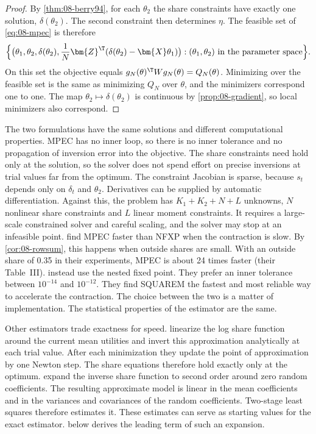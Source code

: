 \begin{proof}
By \cref{thm:08-berry94}, for each $\theta_2$ the share constraints have exactly one solution,
$\delta(\theta_2)$. The second constraint then determines $\eta$. The feasible set of \eqref{eq:08-mpec} is
therefore
\begin{equation*}
  \Big\{\big(\theta_1, \theta_2, \delta(\theta_2), \frac{1}{N}\bm{Z}^\T(\delta(\theta_2) -
  \bm{X}\theta_1)\big): (\theta_1, \theta_2) \text{ in the parameter space}\Big\}.
\end{equation*}
On this set the objective equals $g_N(\theta)^\T Wg_N(\theta) = Q_N(\theta)$. Minimizing over the feasible set
is the same as minimizing $Q_N$ over $\theta$, and the minimizers correspond one to one. The map
$\theta_2 \mapsto \delta(\theta_2)$ is continuous by \cref{prop:08-gradient}, so local minimizers also
correspond.
\end{proof}

The two formulations have the same solutions and different computational properties. MPEC has no inner loop,
so there is no inner tolerance and no propagation of inversion error into the objective. The share
constraints need hold only at the solution, so the solver does not spend effort on precise inversions at trial
values far from the optimum. The constraint Jacobian is sparse, because $s_t$ depends only on $\delta_t$ and
$\theta_2$. Derivatives can be supplied by automatic differentiation. Against this, the problem has $K_1 +
K_2 + N + L$ unknowns, $N$ nonlinear share constraints and $L$ linear moment constraints. It requires a large-scale constrained solver and
careful scaling, and the solver may stop at an infeasible point. \citet[Section~7]{DubeFoxSu2012} find MPEC
faster than NFXP when the contraction is slow. By \cref{cor:08-rowsum}, this happens when outside shares are
small. With an outside share of 0.35 in their experiments, MPEC is about 24 times faster (their Table~III).
\citet[Sections~3 and~5]{ConlonGortmaker2020} instead use the nested fixed point. They prefer an inner tolerance
between $10^{-14}$ and $10^{-12}$. They find SQUAREM the fastest and most reliable way to accelerate the
contraction.
The choice between the two is a matter of implementation. The statistical properties of the estimator are the same.

Other estimators trade exactness for speed. \citet[Section~5]{LeeSeo2015} linearize the log share function around
the current mean utilities and invert this approximation analytically at each trial value. After each minimization
they update the point of approximation by one Newton step. The share equations therefore hold exactly only at the
optimum.
\citet[Sections~2 and~3]{SalanieWolak2019} expand the inverse share function to second order around zero random
coefficients. The resulting approximate model is linear in the mean coefficients and in the variances and
covariances of the random coefficients. Two-stage least squares therefore estimates it. These estimates can serve as
starting values for the exact estimator.
 below derives the leading term of such an expansion.

